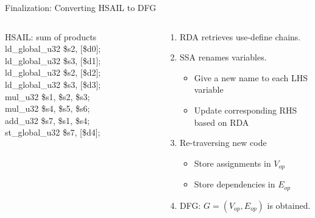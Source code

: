 \documentclass{beamer}
\begin{document}
\begin{CJK}{UTF8}{bkai}
    \begin{frame}{Finalization: Converting HSAIL to DFG}
        \begin{columns}
            \begin{column}{0.45\textwidth}
               \begin{block}{HSAIL: sum of products}
                   ld\_global\_u32 \$s2, [\$d0]; \\ 
                   ld\_global\_u32 \$s3, [\$d1]; \\ 
                   ld\_global\_u32 \$s2, [\$d2]; \\
                   ld\_global\_u32 \$s3, [\$d3]; \\
                   mul\_u32 \$s1, \$s2, \$s3; \\
                   mul\_u32 \$s4, \$s5, \$s6; \\
                   add\_u32 \$s7, \$s1, \$s4; \\
                   st\_global\_u32 \$s7, [\$d4]; \\
               \end{block} 
            \end{column}
            \begin{column}{0.55\textwidth}
                \begin{enumerate}
                    \item RDA retrieves use-define chains.
                    \item SSA renames variables.
                        \begin{itemize}
                            \item Give a new name to each LHS variable
                            \item Update corresponding RHS based on RDA
                        \end{itemize}
                    \item Re-traversing new code
                        \begin{itemize}
                            \item Store assignments in $V_{op}$
                            \item Store dependencies in $E_{op}$
                        \end{itemize}
                    \item DFG: $G = (V_{op}, E_{op})$ is obtained.
                \end{enumerate}
           \end{column}
        \end{columns}
    \end{frame}


\end{CJK}
\end{document}
